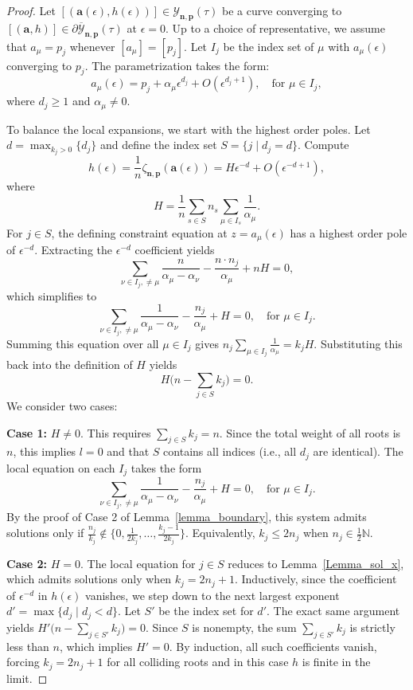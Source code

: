 \documentclass[11pt]{amsart}
\theoremstyle{remark}
\numberwithin{equation}{section}
\begin{document}
\begin{proof}
Let $[(\mathbf{a}(\epsilon),h(\epsilon))] \in \mathcal{Y}_{\mathbf{n},\mathbf{p}}(\tau)$ be a curve converging to $[(\mathbf{a},h)] \in \partial \overline{\mathcal{Y}}_{\mathbf{n},\mathbf{p}}(\tau)$ at $\epsilon=0$. 
Up to a choice of representative, we assume that $a_\mu = p_j$ whenever $[a_\mu] = [p_j]$.
Let $I_j$ be the index set of $\mu$ with $a_\mu(\epsilon)$ converging to $p_j$. The parametrization takes the form:
\[
a_\mu(\epsilon) = p_j + \alpha_\mu \epsilon^{d_j} + O(\epsilon^{d_j+1}), \quad \text{for } \mu \in I_j,
\]
where $d_j \geq 1$ and $\alpha_\mu \neq 0$. 

To balance the local expansions, we start with the highest order poles. Let $d = \max_{k_j>0} \{d_j\}$ and define the index set $S = \{ j \mid d_j = d \}$. Compute
\[
    h(\epsilon) = \frac{1}{n}\zeta_{\mathbf{n},\mathbf{p}}(\mathbf{a}(\epsilon)) = H \epsilon^{-d} + O(\epsilon^{-d+1}),
\]
where 
\[
H = \frac{1}{n} \sum_{s \in S} n_s \sum_{\mu \in I_s} \frac{1}{\alpha_\mu}.
\]
For $j \in S$, the defining constraint equation at $z=a_\mu(\epsilon)$ has a highest order pole of $\epsilon^{-d}$. Extracting the $\epsilon^{-d}$ coefficient yields
\[
\sum_{\nu \in I_j, \neq \mu} \frac{n}{\alpha_\mu - \alpha_\nu} - \frac{n \cdot n_j}{\alpha_\mu} + n H = 0,
\]
which simplifies to
\[
\sum_{\nu \in I_j, \neq \mu} \frac{1}{\alpha_\mu - \alpha_\nu} - \frac{n_j}{\alpha_\mu} + H = 0, \quad \text{for } \mu \in I_j.
\]
Summing this equation over all $\mu \in I_j$ gives $n_j \sum_{\mu \in I_j} \frac{1}{\alpha_\mu} = k_j H$. Substituting this back into the definition of $H$ yields
\[
H \Big( n - \sum_{j \in S} k_j \Big) = 0.
\]
We consider two cases:

\noindent \textbf{Case 1:} $H \neq 0$. This requires $\sum_{j \in S} k_j = n$. Since the total weight of all roots is $n$, this implies $l=0$ and that $S$ contains all indices (i.e., all $d_j$ are identical). The local equation on each $I_j$ takes the form
\[
\sum_{\nu \in I_j, \neq \mu} \frac{1}{\alpha_\mu - \alpha_\nu} - \frac{n_j}{\alpha_\mu} + H = 0, \quad \text{for } \mu \in I_j.
\]
By the proof of Case 2 of Lemma~\ref{lemma_boundary}, this system admits solutions only if $\frac{n_j}{k_j} \notin \{ 0, \frac{1}{2k_j}, \dots, \frac{k_j-1}{2k_j} \}$. Equivalently, $k_j \leq 2n_j$ when $n_j \in \frac{1}{2} \mathbb{N}$.

\noindent \textbf{Case 2:} $H = 0$. The local equation for $j \in S$ reduces to Lemma~\ref{Lemma_sol_x}, which admits solutions only when $k_j = 2n_j+1$. 
Inductively, since the coefficient of $\epsilon^{-d}$ in $h(\epsilon)$ vanishes, we step down to the next largest exponent $d' = \max \{d_j \mid d_j < d\}$. Let $S'$ be the index set for $d'$. The exact same argument yields $H' \Big( n - \sum_{j \in S'} k_j \Big) = 0$. Since $S$ is nonempty, the sum $\sum_{j \in S'} k_j$ is strictly less than $n$, which implies $H'=0$. By induction, all such coefficients vanish, forcing $k_j = 2n_j+1$ for all colliding roots and in this case $h$ is finite in the limit.
\end{proof}
\end{document}
